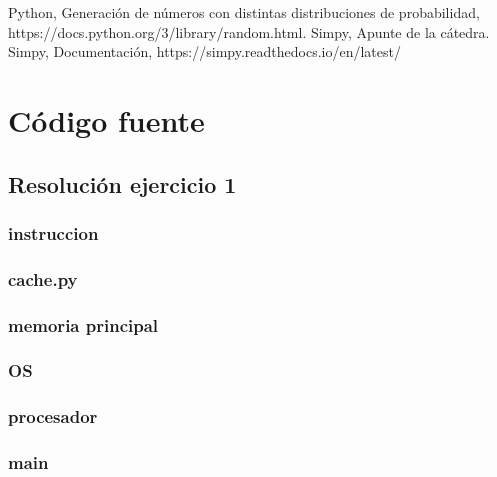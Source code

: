 \documentclass[11pt,a4paper]{article}
\begin{document}
\begin{thebibliography}{10}
	\bibitem{} Python, Generación de números con distintas distribuciones de probabilidad, https://docs.python.org/3/library/random.html.
	\bibitem{} Simpy, Apunte de la cátedra.
	\bibitem{} Simpy, Documentación, https://simpy.readthedocs.io/en/latest/
	

\end{thebibliography}


\newpage
\appendix
\section{Código fuente}\label{appendix_codigo_fuente}

	\subsection{Resolución ejercicio 1}\label{ejercicio_1}
		\subsubsection{instruccion}
			
		\subsubsection{cache.py}
			
		\subsubsection{memoria principal}
			
		\subsubsection{OS}
			
		\subsubsection{procesador}
			
		\subsubsection{main}
			
\end{document}

